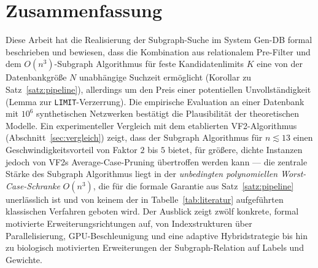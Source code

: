 \documentclass[a4paper,12pt]{article}
\theoremstyle{definition}
\begin{document}
\section{Zusammenfassung}

Diese Arbeit hat die Realisierung der Subgraph-Suche im System Gen-DB formal beschrieben und bewiesen, dass die Kombination aus relationalem Pre-Filter und dem $O(n^3)$-Subgraph Algorithmus für feste Kandidatenlimits $K$ eine von der Datenbankgröße $N$ unabhängige Suchzeit ermöglicht (Korollar zu Satz~\ref{satz:pipeline}), allerdings um den Preis einer potentiellen Unvollständigkeit (Lemma zur \texttt{LIMIT}-Verzerrung). Die empirische Evaluation an einer Datenbank mit $10^6$ synthetischen Netzwerken bestätigt die Plausibilität der theoretischen Modelle. Ein experimenteller Vergleich mit dem etablierten VF2-Algorithmus (Abschnitt~\ref{sec:vergleich}) zeigt, dass der Subgraph Algorithmus für $n\lesssim 13$ einen Geschwindigkeitsvorteil von Faktor $2$ bis $5$ bietet, für größere, dichte Instanzen jedoch von VF2s Average-Case-Pruning übertroffen werden kann — die zentrale Stärke des Subgraph Algorithmus liegt in der \emph{unbedingten polynomiellen Worst-Case-Schranke} $O(n^3)$, die für die formale Garantie aus Satz~\ref{satz:pipeline} unerlässlich ist und von keinem der in Tabelle~\ref{tab:literatur} aufgeführten klassischen Verfahren geboten wird. Der Ausblick zeigt zwölf konkrete, formal motivierte Erweiterungsrichtungen auf, von Indexstrukturen über Parallelisierung, GPU-Beschleunigung und eine adaptive Hybridstrategie bis hin zu biologisch motivierten Erweiterungen der Subgraph-Relation auf Labels und Gewichte.
\end{document}
